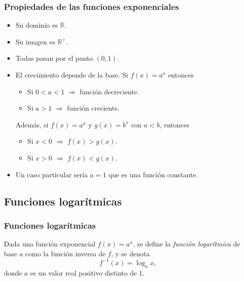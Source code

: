 	
	\begin{frame}
		\frametitle{Propiedades de las funciones exponenciales}
		\begin{itemize}
			\item Su dominio es $\mathbb{R}$.
			\item Su imagen es $\mathbb{R}^+$.
			\item Todas pasan por el punto $(0,1)$.
			\item El crecimiento depende de la base. Si $f(x)=a^x$ entonces
			      \begin{itemize}
			      	\item Si $0<a<1$ $\Rightarrow$ función decreciente.
			      	\item Si $a>1$ $\Rightarrow$ función creciente. 
			      \end{itemize}
			      Además, si $f(x)=a^x$ y $g(x)=b^x$ con $a<b$, entonces
			      \begin{itemize}
			      	\item Si $x<0$ $\Rightarrow$ $f(x)>g(x)$.
			      	\item Si $x>0$ $\Rightarrow$ $f(x)<g(x)$.
			      \end{itemize}
			      
			\item Un caso particular sería $a=1$ que es una función constante.
		\end{itemize}
	\end{frame} 
	
	
	
	\subsection{Funciones logarítmicas}
	\begin{frame}
		\frametitle{Funciones logarítmicas}
		\begin{definicion}
			Dada una función exponencial $f(x)=a^x$, se define la \emph{función logarítmica} de base $a$ como la función inversa de
			$f$, y se denota
			\[
				f^{-1}(x)=\log_a x,
			\]
			donde $a$ es un valor real positivo distinto de 1.
		\end{definicion}
		\begin{center}
			\scalebox{1}{}
		\end{center}
	\end{frame} 
	
